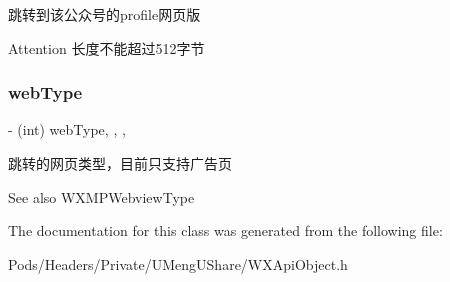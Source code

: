 跳转到该公众号的profile网页版 \begin{DoxyAttention}{Attention}
长度不能超过512字节 
\end{DoxyAttention}
\mbox{\label{interface_jump_to_biz_webview_req_ab8d9875cfa2b308fb96d76d06527c02b}} 
\subsubsection{\texorpdfstring{web\+Type}{webType}}
{\footnotesize\ttfamily -\/ (int) web\+Type\hspace{0.3cm}{\ttfamily [read]}, {\ttfamily [write]}, {\ttfamily [nonatomic]}, {\ttfamily [assign]}}

跳转的网页类型，目前只支持广告页 \begin{DoxySeeAlso}{See also}
W\+X\+M\+P\+Webview\+Type 
\end{DoxySeeAlso}


The documentation for this class was generated from the following file\+:\begin{DoxyCompactItemize}
\item 
Pods/\+Headers/\+Private/\+U\+Meng\+U\+Share/W\+X\+Api\+Object.\+h\end{DoxyCompactItemize}
